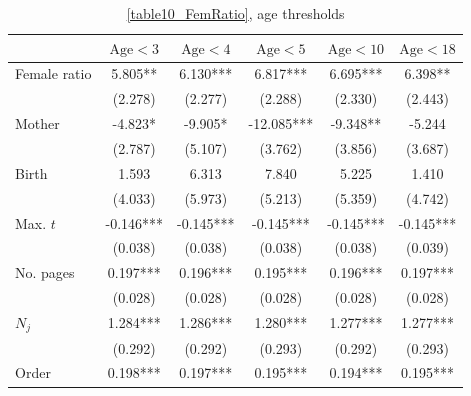 \begin{table}[H]
    \footnotesize
    \centering
    \begin{threeparttable}
        \caption{\autoref{table10_FemRatio}, age thresholds}
        \label{table10_thresholds}
        \begin{tabular}{p{4cm}SSSSS}
            \toprule
            &{\(\text{Age}<3\)}&{\(\text{Age}<4\)}&{\(\text{Age}<5\)}&{\(\text{Age}<10\)}&{\(\text{Age}<18\)}\\
            \midrule
            Female ratio                  &       5.805** &       6.130***&       6.817***&       6.695***&       6.398** \\
                                          &     (2.278)   &     (2.277)   &     (2.288)   &     (2.330)   &     (2.443)   \\
            Mother                        &      -4.823*  &      -9.905*  &     -12.085***&      -9.348** &      -5.244   \\
                                          &     (2.787)   &     (5.107)   &     (3.762)   &     (3.856)   &     (3.687)   \\
            Birth                         &       1.593   &       6.313   &       7.840   &       5.225   &       1.410   \\
                                          &     (4.033)   &     (5.973)   &     (5.213)   &     (5.359)   &     (4.742)   \\
            Max. \(t\)                    &      -0.146***&      -0.145***&      -0.145***&      -0.145***&      -0.145***\\
                                          &     (0.038)   &     (0.038)   &     (0.038)   &     (0.038)   &     (0.039)   \\
            No. pages                     &       0.197***&       0.196***&       0.195***&       0.196***&       0.197***\\
                                          &     (0.028)   &     (0.028)   &     (0.028)   &     (0.028)   &     (0.028)   \\
            \(N_j\)                       &       1.284***&       1.286***&       1.280***&       1.277***&       1.277***\\
                                          &     (0.292)   &     (0.292)   &     (0.293)   &     (0.292)   &     (0.293)   \\
            Order                         &       0.198***&       0.197***&       0.195***&       0.194***&       0.195***\\

\end{tabular}
\end{threeparttable}
\end{table}
